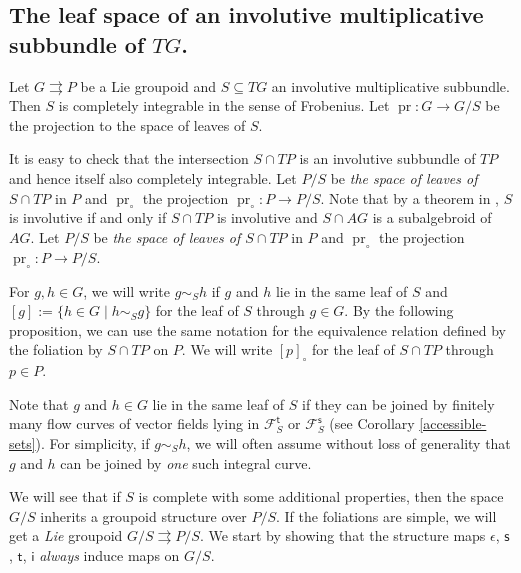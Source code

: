 \documentclass{amsart}
\theoremstyle{definition}
\begin{document}
\subsection{The leaf space of an involutive multiplicative subbundle of $TG$.}
Let $G{{\rightrightarrows}} P$ be a Lie groupoid and $S\subseteq TG$ an involutive 
multiplicative subbundle. Then
$S$ is completely
integrable in the sense of Frobenius.
Let $\operatorname{pr}:G\to G/S$ be the projection to the space of leaves of $S$.

 It is easy to check that
the intersection $S\cap TP$ is an involutive 
subbundle of $TP$ and hence itself
also completely integrable. 
Let $P/S$ be \emph{the space of leaves of $S\cap TP$} in 
$P$ and $\operatorname{pr}_\circ$ the projection $\operatorname{pr}_\circ: P\to  P/S$.
Note that by a theorem in \cite{Jotz11c},
$S$ is involutive if and only if $S\cap TP$ is involutive
and $S\cap AG$ is a subalgebroid of $AG$.
Let $P/S$ be \emph{the space of leaves of $S\cap TP$} in 
$P$ and $\operatorname{pr}_\circ$ the projection $\operatorname{pr}_\circ: P\to  P/S$.

For $g,h\in G$, we will write $g\sim_S h$ 
if $g$ and $h$ lie in the same leaf of $S$
and $[g]:=\{h\in G\mid h\sim_S g\}$ for the leaf of $S$ through $g\in G$. 
By the following proposition,
we can use the same notation for the equivalence
relation defined by the foliation by $S\cap TP$ on $P$.
We will write $[p]_\circ$ for the leaf of $S\cap TP$ through $p\in P$.

Note that $g$ and $h\in G$ lie in the same leaf of $S$ if they can 
be joined by finitely many flow curves of vector fields lying in $\mathcal
F_S^{{\mathsf{t}}}$ or $\mathcal F_S^{{\mathsf{s}}}$ (see Corollary \ref{accessible-sets}). 
For simplicity, if $g\sim_S h$, we will often assume 
without loss of generality that $g$ and $h$ can be joined by \emph{one}
such integral curve.

\medskip

We will see that if $S$ is complete with some additional properties,
 then the space $G/S$ inherits a groupoid structure over 
$P/S$. If the foliations are simple, we will
get a \emph{Lie} groupoid 
$G/S{{\rightrightarrows}} P/S$. We start by showing that the structure maps $\epsilon$, ${{\mathsf{s}}}$, ${{\mathsf{t}}}$, $\mathsf i$ 
\emph{always} induce maps on $G/S$.
\end{document}
